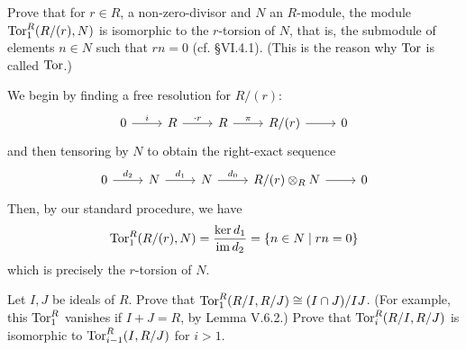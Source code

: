 \documentclass[../../master.tex]{subfiles}
\begin{document}
\begin{problem}
    Prove that for $r \in R$, a non-zero-divisor and $N$ an $R$-module, the module $\operatorname{Tor}_1^{R}(R / (r), N)$ is isomorphic to the $r$-torsion of $N$, that is, the submodule of elements $n \in N$ such that $rn = 0$ (cf. \S VI.4.1).
    (This is the reason why $\operatorname{Tor}$ is called $\operatorname{Tor}$.)
\end{problem}

\begin{solution}
    We begin by finding a free resolution for $R / (r)$:
    \[
    \begin{tikzcd}
        0 & R & R & R/(r) & 0
        \arrow["i", from=1-1, to=1-2]
        \arrow["\cdot r", from=1-2, to=1-3]
        \arrow["\pi", from=1-3, to=1-4]
        \arrow[from=1-4, to=1-5] 
    \end{tikzcd}
    \]
    and then tensoring by $N$ to obtain the right-exact sequence
    \[
    \begin{tikzcd}
        0 & N & N & R/(r) \otimes_R N & 0
        \arrow["d_2", from=1-1, to=1-2] 
        \arrow["d_1", from=1-2, to=1-3]
        \arrow["d_0", from=1-3, to=1-4]
        \arrow[from=1-4, to=1-5] 
    \end{tikzcd}
    \]
    Then, by our standard procedure, we have
    \[
        \operatorname{Tor}_1^{R}(R/(r), N) = \frac{\ker d_1}{\operatorname{im} d_2} = \{n \in N \mid rn = 0\}
    \]
    which is precisely the $r$-torsion of $N$.
\end{solution}

\begin{problem}
    Let $I, J$ be ideals of $R$.
    Prove that $\operatorname{Tor}_1^{R}(R/I, R/J) \cong (I \cap J)/IJ$.
    (For example, this $\operatorname{Tor}_1^{R}$ vanishes if $I + J = R$, by Lemma V.6.2.)
    Prove that $\operatorname{Tor}_i^{R}(R/I, R/J)$ is isomorphic to $\operatorname{Tor}_{i-1}^{R}(I, R/J)$ for $i > 1$.
\end{problem}
\end{document}
